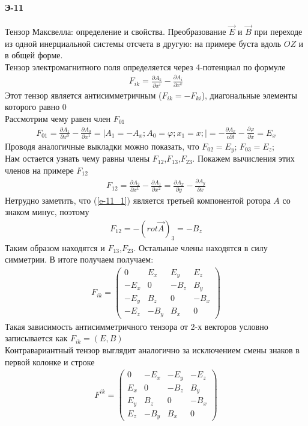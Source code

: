 \documentclass[__main__.tex]{subfiles}
\begin{document}
\paragraph{Э-11}
Тензор Максвелла: определение и свойства. Преобразование $\vec E$ и $\vec B$ при переходе из одной инерциальной системы отсчета в другую: на примере буста вдоль $OZ$ и в общей форме.\\

Тензор электромагнитного поля определяется через 4-потенциал по формуле
\begin{gather*}
	F_{ik} = \frac{\partial A_k}{\partial x^i}-\frac{\partial A_i}{\partial x^k}
\end{gather*}
Этот тензор является антисимметричным ($F_{ik}=-F_{ki}$), диагональные элементы которого равно 0\\
Рассмотрим чему равен член $F_{01}$
\begin{gather*}
F_{01} = \frac{\partial A_1}{\partial x^0}-\frac{\partial A_0}{\partial x^1}=\bigg|A_1=-A_x;A_0=\varphi;x_1=x;\bigg|= -\frac{\partial A_x}{c\partial t}-\frac{\partial \varphi}{\partial x} = E_x
\end{gather*}
Проводя аналогичные выкладки можно показать, что $\displaystyle F_{02} = E_y$; $\displaystyle F_{03} = E_z$;\\
Нам остается узнать чему равны члены $F_{12}$,$F_{13}$,$F_{23}$. Покажем вычисления этих членов на примере $F_{12}$  
\begin{gather}
\label{e-11_1}
	F_{12} = \frac{\partial A_2}{\partial x^1}-\frac{\partial A_1}{\partial x^2} = \frac{\partial A_x}{\partial y}-\frac{\partial A_y}{\partial x}
\end{gather}
Нетрудно заметить, что (\ref{e-11_1}) является третьей компонентой ротора $A$ со знаком минус, поэтому 
\begin{gather*}
	F_{12} = -\left(rot\vec A\right)_3=-B_z
\end{gather*}
Таким образом находятся и  $F_{13}$,$F_{23}$. Остальные члены находятся в силу симметрии. В итоге получаем получаем:
\begin{gather*}
	F_{ik} = \begin{pmatrix}
	0 & E_x & E_y & E_z \\
	-E_x & 0 & -B_z & B_y \\         
	-E_y & B_z & 0 & -B_x \\
	-E_z & -B_y & B_x & 0
	\end{pmatrix}
\end{gather*}
Такая зависимость антисимметричного тензора от 2-х векторов условно записывается как $F_{ik} = (E,B)$\\
Контравариантный тензор выглядит аналогично за исключением смены знаков в первой колонке и строке
\begin{gather*}
F^{ik} = \begin{pmatrix}
0 & -E_x & -E_y & -E_z \\
E_x & 0 & -B_z & B_y \\         
E_y & B_z & 0 & -B_x \\
E_z & -B_y & B_x & 0
\end{pmatrix}
\end{gather*}
\end{document}
